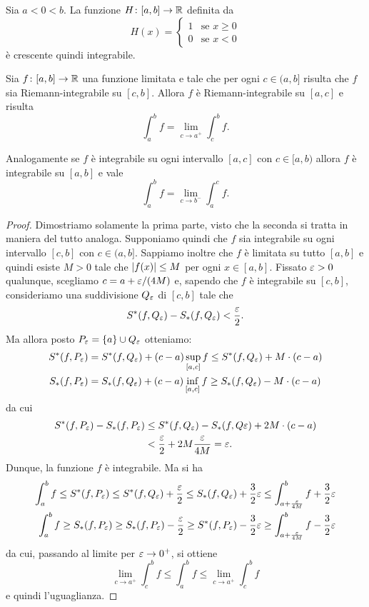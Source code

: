 \begin{example}
\label{ex:heaviside}
Sia $a<0<b$.
La funzione $H\colon [a,b] \to \mathbb R$ definita da
\[
H(x) =
\begin{cases}
1 & \text{se $x\ge 0$}\\
0 & \text{se $x< 0$}
\end{cases}
\]
è crescente quindi integrabile.
\end{example}

\begin{theorem}
\label{th:integrale_continuo}
Sia $f\colon [a,b]\to \mathbb R$ una funzione limitata e tale
che per ogni $c\in (a,b]$ risulta che $f$ sia Riemann-integrabile
su $[c,b]$. Allora $f$ è Riemann-integrabile su $[a,c]$ e risulta
\[
  \int_a^b f = \lim_{c\to a^+} \int_c^b f.
\]

Analogamente se $f$ è integrabile su ogni intervallo $[a,c]$
con $c\in [a,b)$ allora $f$ è integrabile su $[a,b]$ e vale
\[
  \int_a^b f = \lim_{c\to b^-} \int_a^c f.
\]
\end{theorem}
%
\begin{proof}
Dimostriamo solamente la prima parte, visto che la seconda si tratta in
maniera del tutto analoga. Supponiamo quindi che $f$ sia integrabile su ogni
intervallo $[c,b]$ con $c\in (a,b]$. Sappiamo inoltre che $f$ è limitata su
tutto $[a,b]$ e quindi esiste $M>0$ tale che ${\left|f(x)\right|}\le M$ per ogni
$x\in [a,b]$. Fissato $\varepsilon>0$ qualunque,
scegliamo $c = a + \varepsilon/(4M)$ e, sapendo che $f$ è integrabile su $[c,b]$,
consideriamo una suddivisione $Q_\varepsilon$ di $[c,b]$ tale che
\[
  S^*(f, Q_\varepsilon) - S_*(f, Q_\varepsilon) < \frac {\varepsilon} 2.
\]
Ma allora posto $P_\varepsilon = {\left\{ a \right\}} \cup Q_\varepsilon$ otteniamo:
\begin{align*}
  S^*(f,P_\varepsilon) &= S^*(f,Q_\varepsilon) + (c-a)\sup_{[a,c]} f
    \le S^*(f,Q_\varepsilon) + M \cdot (c-a)\\
  S_*(f,P_\varepsilon) &= S_*(f,Q_\varepsilon) + (c-a)\inf_{[a,c]} f
    \ge S_*(f,Q_\varepsilon) - M \cdot (c-a)
\end{align*}
da cui
\begin{align*}
 S^*(f,P_\varepsilon)-S_*(f,P_\varepsilon)
 &\le S^*(f,Q_\varepsilon) - S_*(f,Q\varepsilon) + 2 M \cdot (c-a)\\
 &< \frac{\varepsilon}{2} + 2 M \frac{\varepsilon}{4M}
 = \varepsilon.
\end{align*}
Dunque, la funzione $f$ è integrabile. Ma si ha
\begin{align*}
\int_a^b f \le S^*(f,P_\varepsilon) \le S^*(f,Q_\varepsilon) + \frac{\varepsilon}{2}
\le S_*(f,Q_\varepsilon) + \frac 3 2 \varepsilon
\le \int_{a+\frac {\varepsilon}{4M}}^b f + \frac {3}{2} \varepsilon \\
\int_a^b f \ge S_*(f,P_\varepsilon) \ge S_*(f,P_\varepsilon) - \frac{\varepsilon}{2}
\ge S^*(f,P_\varepsilon) - \frac 3 2 \varepsilon
\ge \int_{a+\frac {\varepsilon}{4M}}^b f - \frac {3}{2} \varepsilon
\end{align*}
da cui, passando al limite per $\varepsilon \to 0^+$, si ottiene
\[
  \lim_{c\to a^+} \int_c^b f \le \int_a^b f \le \lim_{c\to a^+} \int_c^b f
\]
e quindi l'uguaglianza.
\end{proof}

